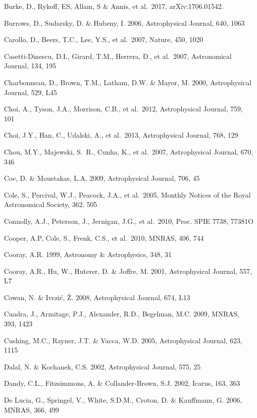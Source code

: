 \documentclass{emulateapj}
\begin{document}
\begin{thebibliography}{}
\bibitem[()]{} Burke, D., Rykoff, ES, Allam, S \& Annis, et al.~2017, arXiv:1706.01542.

\bibitem[()]{} Burrows, D., Sudarsky, D. \& Hubeny, I. 2006, Astrophysical Journal, 640, 1063

\bibitem[()]{} Carollo, D., Beers, T.C., Lee, Y.S., et al.~2007, Nature, 450, 1020	

\bibitem[()]{} Casetti-Dinescu, D.I., Girard, T.M., Herrera, D., et al.~2007, Astronomical Journal, 134, 195
	
\bibitem[()]{} Charbonneau, D., Brown, T.M., Latham, D.W. \& Mayor, M. 2000, Astrophysical Journal, 529, L45

\bibitem[()]{} Choi, A., Tyson, J.A., Morrison, C.B., et al.~2012, Astrophysical Journal, 759, 101 

\bibitem[()]{} Choi, J.Y., Han, C., Udalski, A., et al.~2013, Astrophysical Journal, 768, 129

\bibitem[()]{} Chou, M.Y., Majewski, S.~R., Cunha, K., et al.~2007, Astrophysical Journal, 670, 346

\bibitem[()]{} Coe, D. \& Moustakas, L.A. 2009, Astrophysical Journal, 706, 45 

\bibitem[()]{} Cole, S., Percival, W.J., Peacock, J.A., et al.~2005, Monthly Notices of the Royal 
             Astronomical Society, 362, 505

\bibitem[()]{} Connolly, A.J., Peterson, J., Jernigan, J.G., et al.~2010, Proc. SPIE 7738, 77381O

\bibitem[()]{} Cooper, A.P, Cole, S., Frenk, C.S., et al.~2010, MNRAS, 406, 744

\bibitem[()]{} Cooray, A.R. 1999, Astronomy \& Astrophysics, 348, 31
	
\bibitem[()]{} Cooray, A.R., Hu, W., Huterer, D. \& Joffre, M. 2001, Astrophysical Journal, 557, L7 

\bibitem[()]{} Cowan, N. \& Ivezi\'{c}, \v{Z}. 2008, Astrophysical Journal, 674, L13

\bibitem[()]{} Cuadra, J., Armitage, P.J., Alexander, R.D., Begelman, M.C. 2009, MNRAS, 393, 1423 

\bibitem[()]{} Cushing, M.C., Rayner, J.T. \& Vacca, W.D. 2005, Astrophysical Journal, 623, 1115

\bibitem[()]{} Dalal, N. \& Kochanek, C.S. 2002, Astrophysical Journal, 575, 25

\bibitem[()]{} Dandy, C.L., Fitzsimmons, A. \& Collander-Brown, S.J. 2002, Icarus, 163, 363  

\bibitem[()]{} De Lucia, G., Springel, V., White, S.D.M., Croton, D. \& Kauffmann, G. 2006, MNRAS, 366, 499
	

\end{thebibliography}
\end{document}

